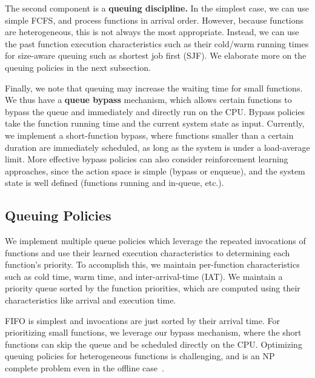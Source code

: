 

The second component is a \textbf{queuing discipline.} 
In the simplest case, we can use simple FCFS, and process functions in arrival order.
However, because functions are heterogeneous, this is not always the most appropriate.
Instead, we can use the past function execution characteristics such as their cold/warm running times for size-aware queuing such as shortest job first (SJF).
We elaborate more on the queuing policies in the next subsection. 

Finally, we note that queuing may increase the waiting time for small functions.
We thus have a \textbf{queue bypass} mechanism, which allows certain functions to bypass the queue and immediately and directly run on the CPU. 
Bypass policies take the function running time and the current system state as input. 
Currently, we implement a short-function bypass, where functions smaller than a certain duration are immediately scheduled, as long as the system is under a load-average limit.  
More effective bypass policies can also consider reinforcement learning approaches, since the action space is simple (bypass or enqueue), and the system state is well defined (functions running and in-queue, etc.).


\subsection{Queuing Policies}
\label{sec:q:pol}

We implement multiple queue policies which leverage the repeated invocations of functions and use their learned execution characteristics to determining each function's priority.
To accomplish this, we maintain per-function characteristics such as cold time, warm time, and inter-arrival-time (IAT). 
We maintain a priority queue sorted by the function priorities, which are computed using their characteristics like arrival and execution time. 

FIFO is simplest and invocations are just sorted by their arrival time.
For prioritizing small functions, we leverage our bypass mechanism, where the short functions can skip the queue and be scheduled directly on the CPU. 
Optimizing queuing policies for heterogeneous functions is challenging, and is an NP complete problem even in the offline case~\cite{bender1998flow}.


